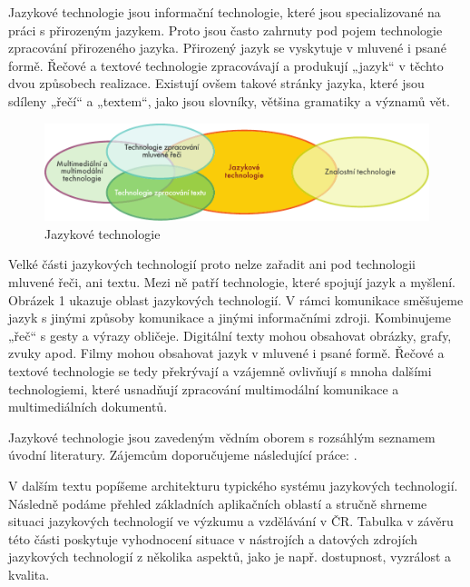 \begin{multicols}{2}

Jazykové technologie jsou informační technologie, které jsou specializované na práci s přirozeným jazykem. Proto jsou často zahrnuty pod pojem technologie zpracování přirozeného jazyka. Přirozený jazyk se vyskytuje v mluvené i psané formě. Řečové a textové technologie zpracovávají a produkují „jazyk“ v těchto dvou způsobech realizace. Existují ovšem takové stránky jazyka, které jsou sdíleny „řečí“ a „textem“, jako jsou slovníky, většina gramatiky a významů vět. 

\begin{figure}[htb]
  \center
  \includegraphics[width=\textwidth]{../_media/czech/language_technologies}
  \caption{Jazykové technologie}
  \label{fig:ltincontext_de}
\end{figure}

Velké části jazykových technologií proto nelze zařadit ani pod technologii mluvené řeči, ani textu. Mezi ně patří technologie, které spojují jazyk a myšlení. Obrázek 1 ukazuje oblast jazykových technologií. V rámci komunikace směšujeme jazyk s jinými způsoby komunikace a jinými informačními zdroji. Kombinujeme „řeč“ s gesty a výrazy obličeje. Digitální texty mohou obsahovat obrázky, grafy, zvuky apod. Filmy mohou obsahovat jazyk v mluvené i psané formě. Řečové a textové technologie se tedy překrývají a vzájemně ovlivňují s mnoha dalšími technologiemi, které usnadňují zpracování multimodální komunikace a multimediálních dokumentů.

Jazykové technologie jsou zavedeným vědním oborem s rozsáhlým seznamem úvodní literatury. Zájemcům doporučujeme následující práce: \cite{carstensen-etal1, jurafsky-martin01, manning-schuetze1, lt-world1, lt-survey1}.

V dalším textu popíšeme architekturu typického systému jazykových technologií. Následně podáme přehled základních aplikačních oblastí a stručně shrneme situaci jazykových technologií ve výzkumu a vzdělávání v ČR. Tabulka v závěru této části poskytuje vyhodnocení situace v nástrojích a datových zdrojích jazykových technologií z několika aspektů, jako je např. dostupnost, vyzrálost a kvalita.


\end{multicols}
